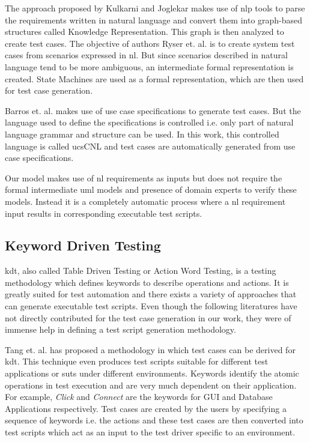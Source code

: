 The approach proposed by Kulkarni and Joglekar \cite{kulkarni2014generating} makes use of \gls{nlp} tools to parse the requirements written in natural language and convert them into graph-based structures called Knowledge Representation. This graph is then analyzed to create test cases. The objective of authors Ryser et. al. \cite{ryser1999practical} is to create system test cases from scenarios expressed in \gls{nl}. But since scenarios described in natural language tend to be more ambiguous, an intermediate formal representation is created. State Machines are used as a formal representation, which are then used for test case generation.

Barros et. al. \cite{barros2011ucscnl} makes use of use case specifications to generate test cases. But the language used to define the specifications is controlled i.e. only part of natural language grammar and structure can be used. In this work, this controlled language is called ucsCNL and test cases are automatically generated from use case specifications.

Our model makes use of \gls{nl} requirements as inputs but does not require the formal intermediate \gls{uml} models and presence of domain experts to verify these models. Instead it is a completely automatic process where a \gls{nl} requirement input results in corresponding executable test scripts.  

\subsection{Keyword Driven Testing}
\gls{kdt}, also called Table Driven Testing or Action Word Testing, is a testing methodology which defines keywords to describe operations and actions. It is greatly suited for test automation and there exists a variety of approaches that can generate executable test scripts. Even though the following literatures have not directly contributed for the test case generation in our work, they were of immense help in defining a test script generation methodology.

Tang et. al. \cite{tang2008towards} has proposed a methodology in which test cases can be derived for \gls{kdt}. This technique even produces test scripts suitable for different test applications or \glspl{sut} under different environments. Keywords identify the atomic operations in test execution and are very much dependent on their application. For example, \textit{Click} and \textit{Connect} are the keywords for GUI and Database Applications respectively. Test cases are created by the users by specifying a sequence of keywords i.e. the actions and these test cases are then converted into test scripts which act as an input to the test driver specific to an environment.

